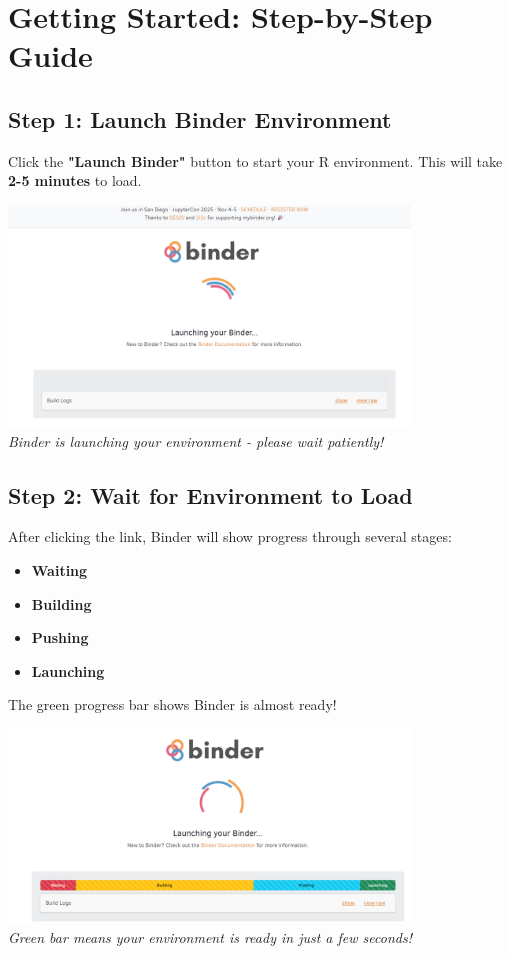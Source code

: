 \documentclass[11pt,a4paper]{article}
\begin{document}
\section{Getting Started: Step-by-Step Guide}

\subsection{Step 1: Launch Binder Environment}

Click the \textbf{"Launch Binder"} button to start your R environment. This will take \textbf{2-5 minutes} to load.

\begin{center}
\includegraphics[width=0.8\textwidth]{../Image_1.png}\\
\textit{Binder is launching your environment - please wait patiently!}
\end{center}

\subsection{Step 2: Wait for Environment to Load}

After clicking the link, Binder will show progress through several stages:
\begin{itemize}
    \item \textbf{Waiting}
    \item \textbf{Building}
    \item \textbf{Pushing}
    \item \textbf{Launching}
\end{itemize}

The green progress bar shows Binder is almost ready!

\begin{center}
\includegraphics[width=0.8\textwidth]{../Image_2.png}\\
\textit{Green bar means your environment is ready in just a few seconds!}
\end{center}
\end{document}
